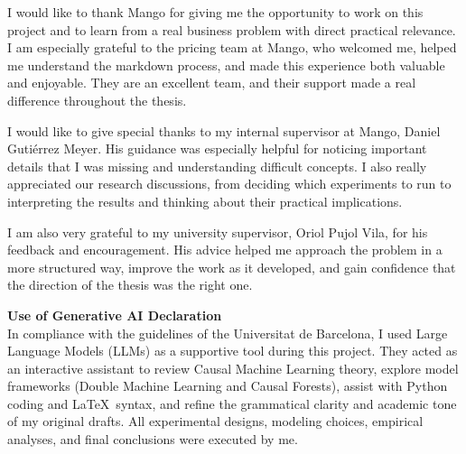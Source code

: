 \documentclass[
11pt, %
english, %
singlespacing, %
headsepline, %
]{MastersDoctoralThesis} %
\begin{document}
\begin{acknowledgements}
\addchaptertocentry{\acknowledgementname} %
I would like to thank Mango for giving me the opportunity to work on this project and to learn from a real business problem with direct practical relevance. I am especially grateful to the pricing team at Mango, who welcomed me, helped me understand the markdown process, and made this experience both valuable and enjoyable. They are an excellent team, and their support made a real difference throughout the thesis.

I would like to give special thanks to my internal supervisor at Mango, Daniel Guti\'errez Meyer. His guidance was especially helpful for noticing important details that I was missing and understanding difficult concepts. I also really appreciated our research discussions, from deciding which experiments to run to interpreting the results and thinking about their practical implications.

I am also very grateful to my university supervisor, Oriol Pujol Vila, for his feedback and encouragement. His advice helped me approach the problem in a more structured way, improve the work as it developed, and gain confidence that the direction of the thesis was the right one.

\vspace{1.5cm}
\begingroup
\raggedright
\noindent\textbf{Use of Generative AI Declaration} \\
\vspace{0.3cm}
\small
In compliance with the guidelines of the Universitat de Barcelona, I used Large Language Models (LLMs) as a supportive tool during this project. They acted as an interactive assistant to review Causal Machine Learning theory, explore model frameworks (Double Machine Learning and Causal Forests), assist with Python coding and \LaTeX\ syntax, and refine the grammatical clarity and academic tone of my original drafts. All experimental designs, modeling choices, empirical analyses, and final conclusions were executed by me.
\endgroup

\end{acknowledgements}

\tableofcontents




\end{document}
